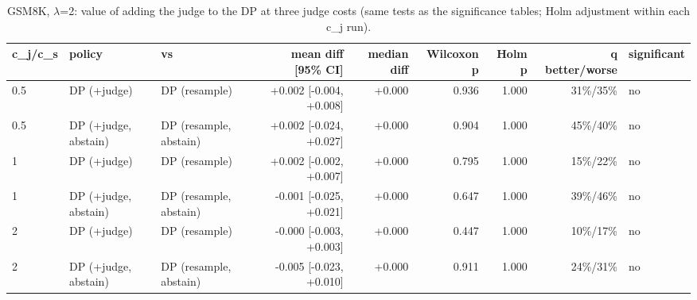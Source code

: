 \begin{table}[t]
\centering
\small
\caption{GSM8K, $\lambda$=2: value of adding the judge to the DP at three judge costs (same tests as the significance tables; Holm adjustment within each c\_j run).}
\label{tab:judge_value_gsm8k}
\begin{tabular}{lllrrrrrl}
\toprule
c\_j/c\_s & policy & vs & mean diff [95\% CI] & median diff & Wilcoxon p & Holm p & q better/worse & significant \\
\midrule
0.5 & DP (+judge) & DP (resample) & +0.002 [-0.004, +0.008] & +0.000 & 0.936 & 1.000 & 31\%/35\% & no \\
0.5 & DP (+judge, abstain) & DP (resample, abstain) & +0.002 [-0.024, +0.027] & +0.000 & 0.904 & 1.000 & 45\%/40\% & no \\
1 & DP (+judge) & DP (resample) & +0.002 [-0.002, +0.007] & +0.000 & 0.795 & 1.000 & 15\%/22\% & no \\
1 & DP (+judge, abstain) & DP (resample, abstain) & -0.001 [-0.025, +0.021] & +0.000 & 0.647 & 1.000 & 39\%/46\% & no \\
2 & DP (+judge) & DP (resample) & -0.000 [-0.003, +0.003] & +0.000 & 0.447 & 1.000 & 10\%/17\% & no \\
2 & DP (+judge, abstain) & DP (resample, abstain) & -0.005 [-0.023, +0.010] & +0.000 & 0.911 & 1.000 & 24\%/31\% & no \\
\bottomrule
\end{tabular}
\end{table}
